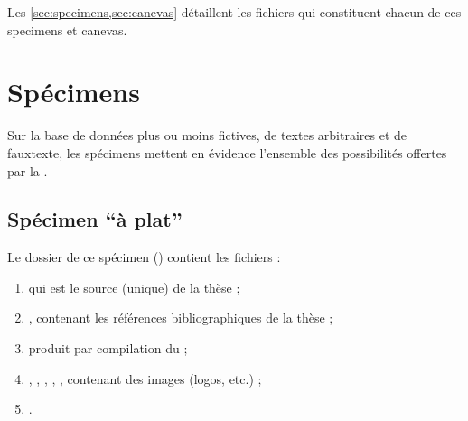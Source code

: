 Les \vref{sec:specimens,sec:canevas} détaillent les fichiers qui constituent
chacun de ces specimens et canevas.




\section{Spécimens}
\label{sec:specimens}

Sur la base de données plus ou moins fictives, de textes arbitraires et de
\gls{fauxtexte}, les spécimens mettent en évidence l'ensemble des possibilités
offertes par la \yatcl{}.

\subsection{Spécimen \enquote{à plat}}
\label{sec:specimen-a-plat}

\def\folder{specimens}
\def\subfolder{a-plat}

Le dossier de ce spécimen (\directory{.../\folder/}\subdirectorytree) contient
les fichiers :
\begin{enumerate}
\item {} qui est le source  (unique) de la thèse ;
\item {}, contenant les références bibliographiques de
  la thèse ;
\item {} produit par compilation du  ;
\item {}, , , ,
  , contenant des images (logos, etc.) ;
\item {}\latexmkrc.
\end{enumerate}

